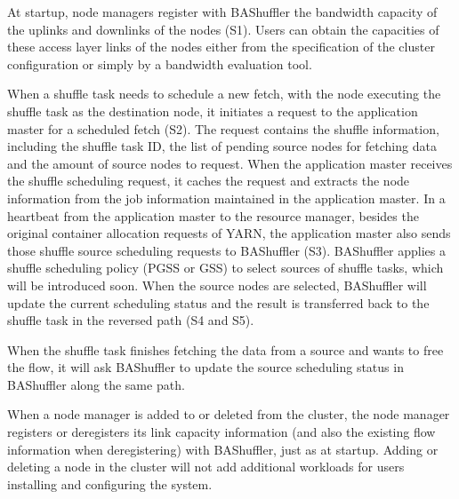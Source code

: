 \documentclass[10pt,journal,compsoc]{IEEEtran}
\begin{document}
At startup, node managers register with BAShuffler the bandwidth capacity of 
the uplinks and downlinks of the nodes (S1). Users can obtain the
capacities of these access layer links of the nodes either from the
specification of the cluster configuration or simply by a bandwidth
evaluation tool.

When a shuffle task needs to schedule a new fetch, with the node executing the shuffle task as the destination node, it initiates a request to the application master
for a scheduled fetch (S2).
The request contains the shuffle information, including 
the shuffle task ID, the list of pending source nodes for fetching
data and the amount of source nodes to request.
When the application master receives the shuffle scheduling request, 
it caches the request and extracts the node information from the job
information maintained in the application master.
In a heartbeat from the application master to the resource manager,
besides the original container allocation requests
of YARN, the application master also sends those shuffle source
scheduling requests to BAShuffler (S3).
BAShuffler applies a shuffle scheduling policy (PGSS or GSS) to select sources of shuffle tasks, which will be introduced soon. 
When the source nodes are selected, BAShuffler will
update the current scheduling status and
the result is transferred back to the shuffle task in the reversed path (S4 and S5). 

When the shuffle task finishes fetching the data from a source and
wants to free the flow,
it will ask BAShuffler to update the source scheduling
status in BAShuffler along the same path.

When a node manager is added to or deleted from the cluster, 
the node manager registers or deregisters its link capacity information 
(and also the existing flow information when deregistering) with BAShuffler, 
just as at startup. 
Adding or deleting a node in the cluster will not add additional workloads 
for users installing and configuring the system. 
\end{document}
